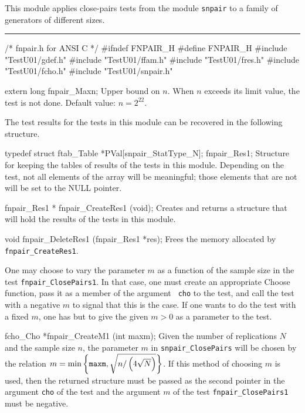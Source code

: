 
This module applies close-pairs tests from the module {\tt snpair}
to a family of generators of different sizes.

\bigskip
\hrule
\code\hide
/* fnpair.h  for ANSI C */
#ifndef FNPAIR_H
#define FNPAIR_H
\endhide
#include "TestU01/gdef.h"
#include "TestU01/ffam.h"
#include "TestU01/fres.h"
#include "TestU01/fcho.h"
#include "TestU01/snpair.h"


extern long fnpair_Maxn;
\endcode
\tab
  Upper bound on $n$.
  When $n$ exceeds its limit value, the test is not done.
  Default value: $n = 2^{22}$.
\endtab
\ifdetailed  %



The test results for the tests in this module can be recovered
in the following structure.

\code

typedef struct {
   ftab_Table *PVal[snpair_StatType_N];
} fnpair_Res1;
\endcode
 \tab
  Structure for keeping the tables of results of the tests in
  this module. Depending on the test, not all elements of the array
  will be meaningful; those elements that are not will be set to
  the NULL pointer.
 \endtab
\code


fnpair_Res1 * fnpair_CreateRes1 (void);
\endcode
 \tab 
  Creates and returns a structure that will hold the results
  of the tests in this module. 
 \endtab
\code


void fnpair_DeleteRes1 (fnpair_Res1 *res);
\endcode
 \tab 
  Frees the memory allocated by {\tt fnpair\_CreateRes1}.
 \endtab

\fi    %



 One may choose to vary the parameter $m$ as a function of the sample size
in the test {\tt fnpair\_ClosePairs1}. In that case, one must create
 an appropriate Choose function, pass it as a member of the argument {\tt
cho} to the test,  and call the test with a negative $m$ to signal that
this is the case. If one wants to
 do the test with a fixed $m$, one has but to give the given $m> 0$ as a
parameter to the test.

\code


fcho_Cho *fnpair_CreateM1 (int maxm);
\endcode
 \tab 
  Given the number of replications $N$  and the sample
  size $n$, the parameter $m$ in {\tt snpair\_Close\-Pairs} will be chosen
  by the relation
   $m = \min\left\{{\tt maxm},\sqrt{{n}/\left(4\sqrt{N}\right)}\right\}$.
  If this method
  of choosing $m$ is used, then  the returned structure must be passed as
  the second pointer in the argument {\tt cho} of the test and the
  argument $m$ of the test  {\tt fnpair\_ClosePairs1} must be negative.
 \endtab
\code


